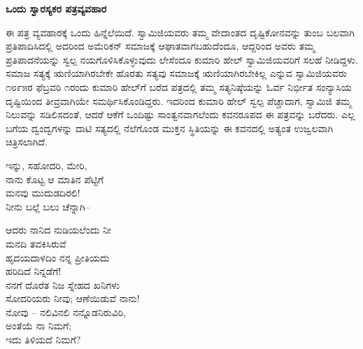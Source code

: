 \begin{myquote}
\end{myquote}

\begin{center}
\textbf{ಒಂದು ಸ್ವಾರಸ್ಯಕರ ಪತ್ರವ್ಯವಹಾರ}
\end{center}

ಈ ಪತ್ರ ವ್ಯವಹಾರಕ್ಕೆ ಒಂದು ಹಿನ್ನೆಲೆಯಿದೆ. ಸ್ವಾಮಿಜಿಯವರು ತಮ್ಮ ವೇದಾಂತದ ದೃಷ್ಟಿಕೋನವನ್ನು ತುಂಬ ಬಲವಾಗಿ ಪ್ರತಿಪಾದಿಸಿದಲ್ಲಿ ಅದರಿಂದ ಅಮೆರಿಕನ್ ಸಮಾಜಕ್ಕೆ ಆಘಾತವಾಗಬಹುದೆಂದೂ, ಆದ್ದರಿಂದ ಅವರು ತಮ್ಮ ಪ್ರತಿಪಾದನೆಯನ್ನು ಸ್ವಲ್ಪ ನಯಗೊಳಿಸಿಕೊಳ್ಳುವುದು ಲೇಸೆಂದೂ ಕುಮಾರಿ ಹೇಲ್ ಸ್ವಾಮಿಜಿಯವರಿಗೆ ಸಲಹೆ ನೀಡಿದ್ದಳು. ಸಮಾಜ ಸತ್ಯಕ್ಕೆ ಋಣಿಯಾಗಿರಬೇಕೇ ಹೊರತು ಸತ್ಯವು ಸಮಾಜಕ್ಕೆ ಋಣಿಯಾಗಿರಬೇಕಿಲ್ಲ ಎನ್ನುವ ಸ್ವಾಮಿಜಿಯವರು ೧೮೯೫ರ ಫೆಬ್ರವರಿ ೧ರಂದು ಕುಮಾರಿ ಹೇಲ್‌ಗೆ ಬರೆದ ಪತ್ರದಲ್ಲಿ ತಮ್ಮ ಸತ್ಯನಿಷ್ಠೆಯನ್ನು ಓರ್ವ ನಿರ್ಭೀತ ಸಂನ್ಯಾಸಿಯ ದೃಷ್ಟಿಯಿಂದ ತೀವ್ರವಾಗಿಯೇ ಸಮರ್ಥಿಸಿಕೊಂಡಿದ್ದರು. ಇದರಿಂದ ಕುಮಾರಿ ಹೇಲ್ ಸ್ವಲ್ಪ ಪೆಚ್ಚಾದಾಗ, ಸ್ವಾಮಿಜಿ ತಮ್ಮ ನಿಲುವನ್ನು ಸಡಿಲಿಸದಂತೆ, ಆದರೆ ಆಕೆಗೆ ಒಂದಿಷ್ಟು ಸಾಂತ್ವನವಾಗಲೆಂದು ಕವನರೂಪದ ಈ ಪತ್ರವನ್ನು ಬರೆದರು. ಎಲ್ಲ ಬಗೆಯ ದ್ವಂದ್ವಗಳನ್ನು ದಾಟಿ ಸತ್ಯದಲ್ಲಿ ನೆಲೆಗೊಂಡ ಮುಕ್ತನ ಸ್ಥಿತಿಯನ್ನು ಈ ಕವನದಲ್ಲಿ ಅತ್ಯಂತ ಉಜ್ವಲವಾಗಿ ಚಿತ್ರಿಸಲಾಗಿದೆ.

\begin{myquote}
ಇನ್ನು, ಸಹೋದರಿ, ಮೇರಿ,\\ನಾನು ಕೊಟ್ಟ ಆ ಮಾತಿನ ಪೆಟ್ಟಿಗೆ\\ಮನವು ಮುದುಡದಿರಲಿ!\\ನೀನು ಬಲ್ಲೆ ಬಲು ಚೆನ್ನಾಗಿ–
\end{myquote}

\begin{myquote}
ಆದರು ನಾನಿದ ನುಡಿಯಲೆಂದು ನೀ\\ಮನದಿ ತವಕಿಸಿರುವೆ\\ಹೃದಯದಾಳದಿಂ ನನ್ನ ಪ್ರೀತಿಯದು\\ಹರಿದಿದೆ ನಿನ್ನಡೆಗೆ!\\ನನಗೆ ದೊರೆತ ನಿಜ ಸ್ನೇಹದ ಖನಿಗಳು\\ಸೋದರಿಯರು ನೀವು; ಆಣೆಯಿಡುವೆ ನಾನು!\\ನೋವು – ನಲಿವಿನಲಿ ನನ್ನೊಡನಿರುವಿರಿ,\\ಅಂತೆಯೆ ನಾ ನಿಮಗೆ;\\ಇದು ತಿಳಿಯದೆ ನಿಮಗೆ?
\end{myquote}

